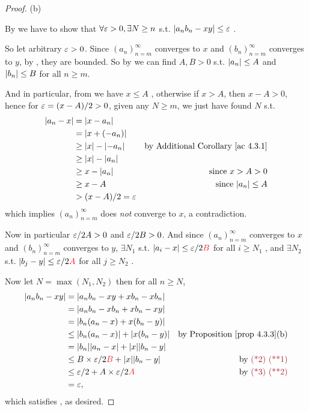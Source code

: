 \begin{proof} (b)

By  we have to show that \(\forall \varepsilon > 0, \exists N \ge n\) s.t. \(\lvert a_n b_n - xy\rvert \le \varepsilon\) .

So let arbitrary \(\varepsilon > 0\).
Since \((a_n)_{n = m}^{\infty}\) converges to \(x\) and \((b_n)_{n = m}^{\infty}\) converges to \(y\), by , they are bounded.
So by  we can find \(A, B > 0\) s.t. \(\lvert a_n\rvert \le A\)  and \(\lvert b_n\rvert \le B\)  for all \(n \ge m\).

And in particular, from  we have \(x \le A\) , otherwise if \(x > A\), then \(x - A > 0\), hence for \(\varepsilon = (x - A)/2 > 0\), given any \(N \ge m\), we just have found \(N\) s.t.
\begin{align*}
    \abs{a_n - x} & = \abs{x - a_n} \\
                  & = \abs{x + (-a_n)} \\
                  & \ge \abs{x} - \abs{-a_n} & \text{by \AC{4.3.1}} \\
                  & \ge \abs{x} - \abs{a_n} \\
                  & \ge x - \abs{a_n} & \text{since \(x > A > 0\)} \\
                  & \ge x - A & \text{since \(\abs{a_n} \le A\)} \\
                  & > (x - A)/2 = \varE
\end{align*}
which implies \((a_n)_{n = m}^{\infty}\) does \emph{not} converge to \(x\), a contradiction.

Now in particular \(\varepsilon/2A > 0\) and \(\varepsilon/2B > 0\).
And since \((a_n)_{n = m}^{\infty}\) converges to \(x\) and \((b_n)_{n = m}^{\infty}\) converges to \(y\),
\(\exists N_1\) s.t. \(\abs{a_i - x} \le \varE/2\RED{B}\) for all \(i \ge N_1\) , and \(\exists N_2\) s.t. \(\abs{b_j - y} \le \varE/2\RED{A}\) for all \(j \ge N_2\) .

Now let \(N = \max(N_1, N_2)\) then for all \(n \ge N\),
\begin{align*}
    \abs{a_n b_n - xy} & = \abs{a_n b_n - xy + x b_n - x b_n}  \\
                       & = \abs{a_n b_n - x b_n + x b_n - xy} \\
                       & = \abs{b_n(a_n - x) + x(b_n - y)} \\
                       & \le \abs{b_n(a_n - x)} + \abs{x(b_n - y)} & \text{by \PROP{4.3.3}(b)} \\
                       & = \abs{b_n}\abs{a_n - x} + \abs{x}\abs{b_n - y} \\
                       & \le B \X \varE/2\RED{B} + \abs{x}\abs{b_n - y} & \text{by \MAROON{(*2) (**1)}} \\
                       & \le \varE/2 + A \X \varE/2\RED{A} & \text{by \MAROON{(*3) (**2)}} \\
                       & = \varE,
\end{align*}
which satisfies , as desired.
\end{proof}

